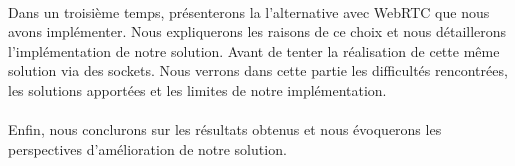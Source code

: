 \paragraph{}
Dans un troisième temps, présenterons la l'alternative avec WebRTC que nous avons implémenter. Nous expliquerons les raisons de ce choix et nous détaillerons l'implémentation de
notre solution. Avant de tenter la réalisation de cette même solution via des sockets. Nous verrons dans cette partie les difficultés rencontrées, les solutions apportées et les
limites de notre implémentation. 

\paragraph{}
Enfin, nous conclurons sur les résultats obtenus et nous évoquerons les perspectives d'amélioration de notre solution.

